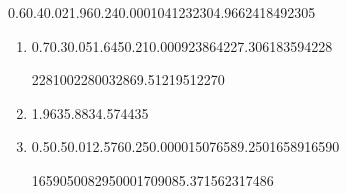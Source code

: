 
\begin{question}
    
    \begin{formula4} 
        {0.6}{0.4}{0.02}{1.96}{0.24}{0.000104123}{2304.966241849}{2305}
    \end{formula4}

\end{question}


\begin{question}
    
    \begin{enumerate}[label={\textbf{\alph*)}}]

        \item 

              \begin{formula4}
                {0.7}{0.3}{0.05}{1.645}{0.21}{0.000923864}{227.306183594}{228}
              \end{formula4}

              \begin{formula5}
                {228}{100}{22800}{328}{69.512195122}{70}
              \end{formula5}

        \item 
              
              \begin{formula6} 
                {1.96}{3}{}{5.88}{34.5744}{35}
              \end{formula6}

        \item 

             \begin{formula4}
                {0.5}{0.5}{0.01}{2.576}{0.25}{0.00001507}{6589.25016589}{16590}
             \end{formula4}

             \begin{formula5}
                {16590}{500}{8295000}{17090}{85.371562317}{486}
             \end{formula5}

    \end{enumerate}
\end{question}

